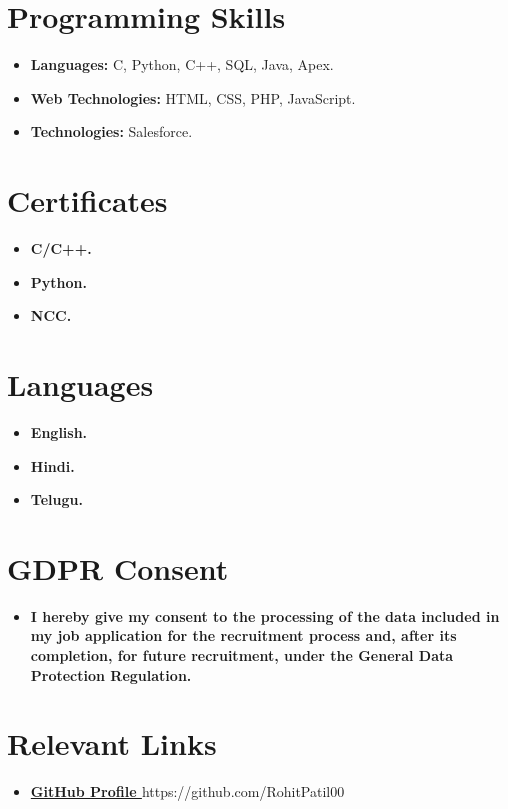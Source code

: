 \documentclass[letterpaper,11pt]{article}
\newcommand{\resumeItem}[2]{
  \item\small{
    \textbf{#1}{#2 \vspace{-2pt}}
  }
}
\newcommand{\resumeSubItem}[2]{\resumeItem{#1}{#2}\vspace{-4pt}}
\newcommand{\resumeSubHeadingListStart}{\begin{itemize}[leftmargin=*]}
\newcommand{\resumeSubHeadingListEnd}{\end{itemize}}
\begin{document}
\section{Programming Skills}
 \resumeSubHeadingListStart
   \item{
     \textbf{Languages:} C, Python, C++, SQL, Java, Apex.
   }
   \item{
     \textbf{Web Technologies:} HTML, CSS, PHP, JavaScript.
   }
   \item{
     \textbf{Technologies:} Salesforce.
   }
 \resumeSubHeadingListEnd

\section{Certificates}
  \resumeSubHeadingListStart
    \resumeSubItem{C/C++.}{}
    \resumeSubItem{Python.}{}
    \resumeSubItem{NCC.}{}
  \resumeSubHeadingListEnd

\section{Languages}
  \resumeSubHeadingListStart
    \resumeSubItem{English.}{}
    \resumeSubItem{Hindi.}{}
    \resumeSubItem{Telugu.}{}
  \resumeSubHeadingListEnd

\section{GDPR Consent}
  \resumeSubHeadingListStart
    \resumeSubItem{I hereby give my consent to the processing of the data included in my job application for the recruitment process and, after its completion, for future recruitment, under the General Data Protection Regulation.}{}
  \resumeSubHeadingListEnd

\section{Relevant Links}
  \resumeSubHeadingListStart
    \resumeSubItem{\href{https://github.com/RohitPatil00}{GitHub Profile }}{https://github.com/RohitPatil00}
  \resumeSubHeadingListEnd

\end{document}
